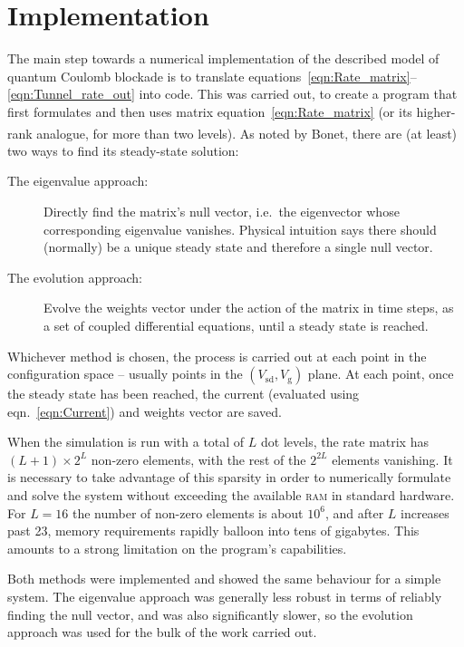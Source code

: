 \documentclass[a4paper,11pt]{article}
\let\oldcite\cite
\renewcommand{\cite}[1]{\textsuperscript{\oldcite{#1}}}
\begin{document}
    \section{Implementation}\label{sec:Implementation}
    The main step towards a numerical implementation of the described model of quantum Coulomb blockade is to translate equations~\ref{eqn:Rate_matrix}--\ref{eqn:Tunnel_rate_out} into code. This was carried out, to create a program that first formulates and then uses matrix equation~\ref{eqn:Rate_matrix} (or its higher-rank analogue, for more than two levels). As noted by Bonet\cite{Bonet-2002}, there are (at least) two ways to find its steady-state solution:
    \begin{description}
        \item[The eigenvalue approach:] Directly find the matrix's null vector, i.e.\ the eigenvector whose corresponding eigenvalue vanishes. Physical intuition says there should (normally) be a unique steady state and therefore a single null vector.
        \item[The evolution approach:] Evolve the weights vector under the action of the matrix in time steps, as a set of coupled differential equations, until a steady state is reached.
    \end{description}
    Whichever method is chosen, the process is carried out at each point in the configuration space -- usually points in the $\left(V_\mathrm{sd},V_\mathrm{g}\right)$ plane. At each point, once the steady state has been reached, the current (evaluated using eqn.~\ref{eqn:Current}) and weights vector are saved.

    When the simulation is run with a total of $L$ dot levels, the rate matrix has $\left(L+1\right)\times2^L$ non-zero elements, with the rest of the $2^{2L}$ elements vanishing. It is necessary to take advantage of this sparsity in order to numerically formulate and solve the system without exceeding the available \textsc{ram} in standard hardware. For $L = 16$ the number of non-zero elements is about $10^6$, and after $L$ increases past 23, memory requirements rapidly balloon into tens of gigabytes. This amounts to a strong limitation on the program's capabilities.

    Both methods were implemented and showed the same behaviour for a simple system. The eigenvalue approach was generally less robust in terms of reliably finding the null vector, and was also significantly slower, so the evolution approach was used for the bulk of the work carried out.
\end{document}
